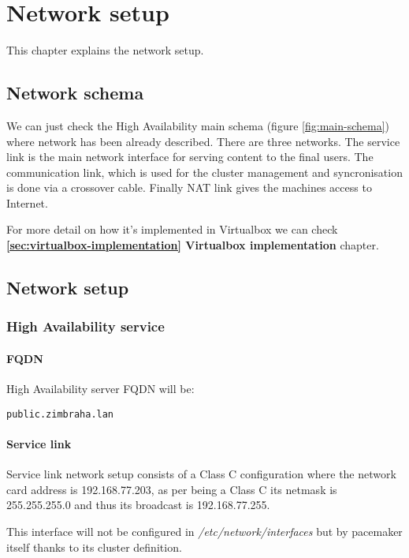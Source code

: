 

\chapter{Network setup}
\label{chap:network-setup}
This chapter explains the network setup.

\section {Network schema}
We can just check the High Availability main schema (figure \ref{fig:main-schema}) where network has been already described. There are three networks. The service link is the main network interface for serving content to the final users. The communication link, which is used for the cluster management and syncronisation is done via a crossover cable. Finally NAT link gives the machines access to Internet.

For more detail on how it's implemented in Virtualbox we can check \textbf{\ref{sec:virtualbox-implementation} Virtualbox implementation} chapter.

\section {Network setup}

\subsection {High Availability service}
\subsubsection {FQDN}
High Availability server FQDN will be:
\begin{verbatim}
public.zimbraha.lan
\end{verbatim}

\subsubsection {Service link}
Service link network setup consists of a Class C configuration where the network card address is 192.168.77.203, as per being a Class C its netmask is 255.255.255.0 and thus its broadcast is 192.168.77.255.

This interface will not be configured in \textit{/etc/network/interfaces} but by pacemaker itself thanks to its cluster definition.

